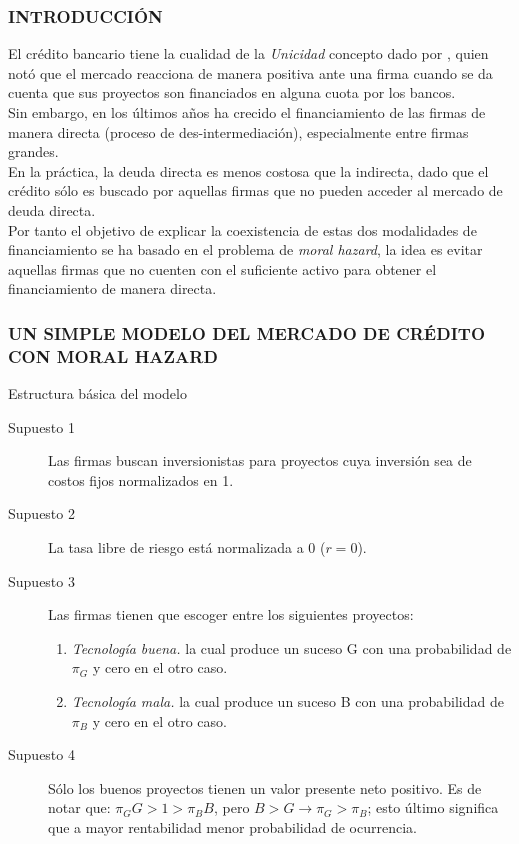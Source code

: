 \begin{frame}
	\frametitle{{\normalsize INTRODUCCIÓN} {}}
		\setcounter{equation}{0}
El crédito bancario tiene la cualidad de la \textit{Unicidad} concepto dado por \cite{James1987}, quien notó que el mercado reacciona de manera positiva ante una firma cuando se da cuenta que sus proyectos son financiados en alguna cuota por los bancos.\\

Sin embargo, en los últimos años ha crecido el financiamiento de las firmas de manera directa (proceso de des-intermediación), especialmente entre firmas grandes.\\
En la práctica, la deuda directa es menos costosa que la indirecta, dado que el crédito sólo es buscado por aquellas firmas que no pueden acceder al mercado de deuda directa.\\
Por tanto el objetivo de explicar la coexistencia de estas dos modalidades de financiamiento se ha basado en el problema de \textit{moral hazard}, la idea es evitar aquellas firmas que no cuenten con el suficiente activo para obtener el financiamiento de manera directa.

\end{frame}

\begin{frame}
    \frametitle{{\normalsize UN SIMPLE MODELO DEL MERCADO DE CRÉDITO CON MORAL HAZARD} {}}
    
    \begin{block} {Estructura básica del modelo}
        \begin{description}
            \item[Supuesto 1] Las firmas buscan inversionistas para proyectos cuya inversión sea de costos fijos normalizados en 1.
            \item[Supuesto 2] La tasa libre de riesgo está normalizada a 0 ($r=0$). 
            \item[Supuesto 3] Las firmas tienen que escoger entre los siguientes proyectos:
            \begin{enumerate}
               \item \textit{Tecnología buena.} la cual produce un suceso G con una probabilidad de $\pi_{G} $ y cero en el otro caso.
               \item \textit{Tecnología mala.} la cual produce un suceso B con una probabilidad de $\pi_{B} $ y cero en el otro caso.
            \end{enumerate}
            \item[Supuesto 4] Sólo los buenos proyectos tienen un valor presente neto positivo. Es de notar que: $\pi_{G}G>1>\pi_{B}B $, pero $B>G\rightarrow \pi_{G}>\pi_{B} $; esto último significa que a mayor rentabilidad menor probabilidad de ocurrencia. 
           
             
            \end{description}
        
    \end{block}	
    
\end{frame}


